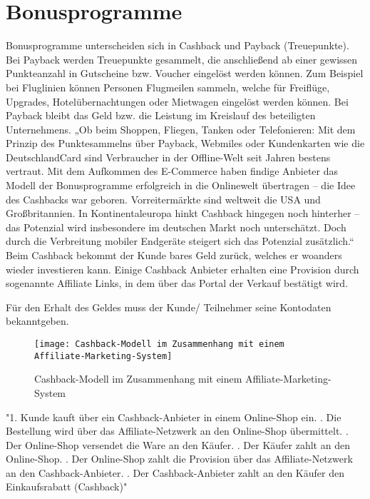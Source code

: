 \section{Bonusprogramme}
Bonusprogramme unterscheiden sich in Cashback und Payback (Treuepunkte).\newline
\noident Bei Payback werden Treuepunkte gesammelt, die anschließend ab einer gewissen Punkteanzahl in Gutscheine bzw. Voucher eingelöst werden können. Zum Beispiel bei Fluglinien können Personen Flugmeilen sammeln, welche für Freiflüge, Upgrades, Hotelübernachtungen oder Mietwagen eingelöst werden können. Bei Payback bleibt das Geld bzw. die Leistung im Kreislauf des beteiligten Unternehmens. \label{paycashback_all} \newline
\noident „Ob beim Shoppen, Fliegen, Tanken oder Telefonieren: Mit dem Prinzip des Punktesammelns über Payback, Webmiles oder Kundenkarten wie die DeutschlandCard sind Verbraucher in der Offline-Welt seit Jahren bestens vertraut. Mit dem Aufkommen des E-Commerce haben findige Anbieter das Modell der Bonusprogramme erfolgreich in die Onlinewelt übertragen – die Idee des Cashbacks war geboren. Vorreitermärkte sind weltweit die USA und Großbritannien. In Kontinentaleuropa hinkt Cashback hingegen noch hinterher – das Potenzial wird insbesondere im deutschen Markt noch unterschätzt. Doch durch die Verbreitung mobiler Endgeräte steigert sich das Potenzial zusätzlich.“ \label{Bonus_affiliate} \newline
\noident Beim Cashback bekommt der Kunde bares Geld zurück, welches er woanders wieder investieren kann. Einige Cashback Anbieter erhalten eine Provision durch sogenannte Affiliate Links, in dem über das Portal der Verkauf bestätigt wird. \label{cashback_vergleich} \newline

\noident Für den Erhalt des Geldes muss der Kunde/ Teilnehmer seine Kontodaten bekanntgeben. \label{paycashback_all} \newline
\begin{figure}[!ht]
	\centering
	\texttt{[image: Cashback-Modell im Zusammenhang mit einem Affiliate-Marketing-System]}
	\caption{Cashback-Modell im Zusammenhang mit einem Affiliate-Marketing-System}
	\label{fig:Bonus_affiliate}
\end{figure}
\FloatBarrier

"1.	Kunde kauft über ein Cashback-Anbieter in einem Online-Shop ein. .	Die Bestellung wird über das Affiliate-Netzwerk an den Online-Shop übermittelt. .	Der Online-Shop versendet die Ware an den Käufer. .	Der Käufer zahlt an den Online-Shop. .	Der Online-Shop zahlt die Provision über das Affiliate-Netzwerk an den Cashback-Anbieter. .	Der Cashback-Anbieter zahlt an den Käufer den Einkaufsrabatt (Cashback)" \label{Bonus_affiliate} \newline

